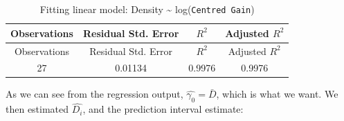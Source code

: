 \documentclass[]{article}
\begin{document}
\begin{longtable}[]{@{}cccc@{}}
\caption{Fitting linear model: Density \textasciitilde{}
log(\texttt{Centred\ Gain})}\tabularnewline
\toprule
\begin{minipage}[b]{0.18\columnwidth}\centering\strut
Observations\strut
\end{minipage} & \begin{minipage}[b]{0.27\columnwidth}\centering\strut
Residual Std. Error\strut
\end{minipage} & \begin{minipage}[b]{0.11\columnwidth}\centering\strut
\(R^2\)\strut
\end{minipage} & \begin{minipage}[b]{0.20\columnwidth}\centering\strut
Adjusted \(R^2\)\strut
\end{minipage}\tabularnewline
\midrule
\endfirsthead
\toprule
\begin{minipage}[b]{0.18\columnwidth}\centering\strut
Observations\strut
\end{minipage} & \begin{minipage}[b]{0.27\columnwidth}\centering\strut
Residual Std. Error\strut
\end{minipage} & \begin{minipage}[b]{0.11\columnwidth}\centering\strut
\(R^2\)\strut
\end{minipage} & \begin{minipage}[b]{0.20\columnwidth}\centering\strut
Adjusted \(R^2\)\strut
\end{minipage}\tabularnewline
\midrule
\endhead
\begin{minipage}[t]{0.18\columnwidth}\centering\strut
27\strut
\end{minipage} & \begin{minipage}[t]{0.27\columnwidth}\centering\strut
0.01134\strut
\end{minipage} & \begin{minipage}[t]{0.11\columnwidth}\centering\strut
0.9976\strut
\end{minipage} & \begin{minipage}[t]{0.20\columnwidth}\centering\strut
0.9976\strut
\end{minipage}\tabularnewline
\bottomrule
\end{longtable}

As we can see from the regression output,
\(\hat{\gamma_{0}} = \bar{D}\), which is what we want. We then estimated
\(\hat{D_{i}}\), and the prediction interval estimate:
\end{document}

